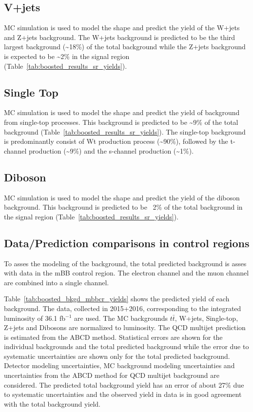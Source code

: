 %
%
\subsection{V+jets}
\label{sec:boosted_bkgd_vjets}
 
MC simulation is used to model the shape and predict the yield of the W+jets and Z+jets background.
The W+jets background is predicted to be the third largest background (\textasciitilde 18\%) of the total background while
the Z+jets background is expected to be \textasciitilde 2\% in the signal region (Table~\ref{tab:boosted_results_sr_yields}).
 
%
%
\subsection{Single Top}
\label{sec:boosted_bkgd_singletop}
 
MC simulation is used to model the shape and predict the yield of background from single-top processes. This background is
predicted to be \textasciitilde 9\% of the total background (Table~\ref{tab:boosted_results_sr_yields}).
The single-top background is predominantly consist of Wt production process
(\textasciitilde 90\%), followed by the t-channel production (\textasciitilde 9\%) and the s-channel production (\textasciitilde 1\%).
 
%
%
\subsection{Diboson}
\label{sec:boosted_bkgd_diboson}
MC simulation is used to model the shape and predict the yield of the diboson background. This background is predicted to be
~2\% of the total background in the signal region  (Table~\ref{tab:boosted_results_sr_yields}).
 
 
\subsection{Data/Prediction comparisons in control regions}
\label{sec:boosted_bkgd_datavspred}
 
To asses the modeling of the background, the total predicted background is asses with data in the mBB control region.
The electron channel and the muon channel are combined into a single channel.
 
Table~\ref{tab:boosted_bkgd_mbbcr_yields} shows the predicted yield of each background. The data, collected in 2015+2016,
corresponding to the integrated luminosity of 36.1 fb$^{-1}$ are used. The MC backgrounds $t\bar{t}$, W+jets,
Single-top, Z+jets and Dibosons are normalized to luminosity. The QCD multijet prediction is estimated from the ABCD method.
Statistical errors are shown for the individual backgrounds and the total predicted background while the error due
to systematic uncertainties are shown only for the total predicted background. Detector modeling uncertainties, MC background modeling
uncertainties and uncertainties from the ABCD method for QCD multijet background are considered.
The predicted total background yield has an error of about 27\% due to systematic uncertainties and
the observed yield in data is in good agreement with the total background yield.
 
